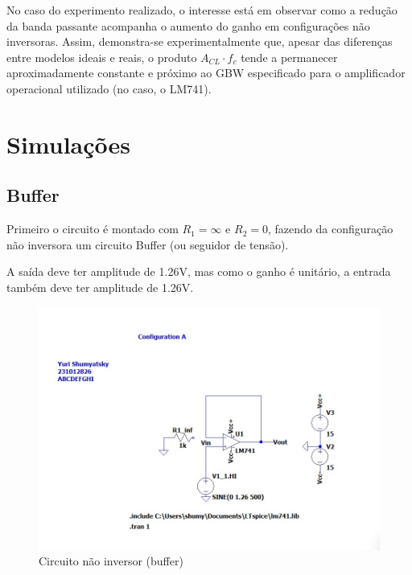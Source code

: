 \documentclass[10pt,twocolumn,letterpaper]{article}
\begin{document}
No caso do experimento realizado, o interesse está em observar como a redução da banda passante acompanha o aumento do ganho em configurações não inversoras. Assim, demonstra-se experimentalmente que, apesar das diferenças entre modelos ideais e reais, o produto $A_{CL} \cdot f_c$ tende a permanecer aproximadamente constante e próximo ao GBW especificado para o amplificador operacional utilizado (no caso, o LM741).





\newpage
\section{Simulações}

\subsection{Buffer}

Primeiro o circuito é montado com $R_1=\infty$ e $R_2=0$, fazendo da configuração não inversora um circuito Buffer (ou seguidor de tensão).

A saída deve ter amplitude de 1.26V, mas como o ganho é unitário, a entrada também deve ter amplitude de 1.26V.

\begin{figure}[h]
\caption{Circuito não inversor (buffer)}
\begin{center}
\includegraphics[scale=0.25]{figuras/fig1}
\end{center}
\end{figure}
\end{document}
